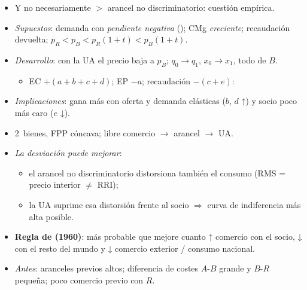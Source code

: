 \documentclass{article}
\begin{document}
\begin{columnas}
\begin{itemize}
\begin{itemize}
  \item Y no necesariamente $>$ arancel no discriminatorio: cuestión empírica.
  \end{itemize}
\end{itemize}
\begin{itemize}
\item \emph{Supuestos}: demanda con \emph{pendiente negativa} (); CMg \emph{creciente}; recaudación devuelta; $p_R<p_B<p_R(1+t)<p_B(1+t)$.
\item \emph{Desarrollo}: con la UA el precio baja a $p_B$; $q_0\to q_1$, $x_0\to x_1$, todo de $B$.
  \begin{itemize}
  \item EC $+(a+b+c+d)$; EP $-a$; recaudación $-(c+e)$:
  \end{itemize}
\item \emph{Implicaciones}: gana más con oferta y demanda elásticas ($b$, $d$ ↑) y socio poco más caro ($e$ ↓).
\end{itemize}
\begin{itemize}
\item 2~bienes, FPP cóncava; libre comercio $\to$ arancel $\to$ UA.
\item \emph{La desviación puede mejorar}:
  \begin{itemize}
  \item el arancel no discriminatorio distorsiona también el consumo ($\mathrm{RMS}$ = precio interior $\neq$ RRI);
  \item la UA suprime esa distorsión frente al socio $\Rightarrow$ curva de indiferencia más alta posible.
  \end{itemize}
\item \textbf{Regla de  (1960)}: más probable que mejore cuanto ↑ comercio con el socio, ↓ con el resto del mundo y ↓ comercio exterior / consumo nacional.
\end{itemize}
\begin{itemize}
\item \emph{Antes}: aranceles previos altos; diferencia de costes $A$-$B$ grande y $B$-$R$ pequeña; poco comercio previo con $R$.

\end{itemize}
\end{columnas}
\end{document}
